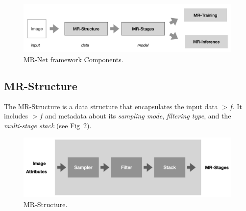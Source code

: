 
\begin{figure}[!h]
\centering
\includegraphics[width=0.99\linewidth]{img/ch4/mr-net-components.png}
\caption{MR-Net framework Components.}
\label{f:components}
\end{figure}


\subsection{MR-Structure}\label{sec:mr_struct}

The MR-Structure is a data structure that encapsulates the input data $\gt{f}$. It includes $\gt{f}$ and metadata about its \textit{sampling mode}, \textit{filtering type}, and the \textit{multi-stage stack} (see Fig~\ref{f:structure}).
\begin{figure}[!h]
\centering
\includegraphics[width=0.89\linewidth]{img/ch4/mr-structure.png}
\caption{MR-Structure.}
\label{f:structure}
\end{figure}


